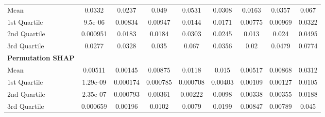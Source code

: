 {\begin{tabular} {lcccccccc}
\hspace{7pt}Mean & 0.0332 & 0.0237 & 0.049 & 0.0531 & 0.0308 & 0.0163 & 0.0357 & 0.067 \\ 
\hspace{7pt}1st Quartile & 9.5e-06 & 0.00834 & 0.00947 & 0.0144 & 0.0171 & 0.00775 & 0.00969 & 0.0322 \\ 
\hspace{7pt}2nd Quartile & 0.000951 & 0.0183 & 0.0184 & 0.0303 & 0.0245 & 0.013 & 0.024 & 0.0495 \\ 
\hspace{7pt}3rd Quartile & 0.0277 & 0.0328 & 0.035 & 0.067 & 0.0356 & 0.02 & 0.0479 & 0.0774 \\ 
\addlinespace[1ex] 
\textbf{Permutation SHAP} &  &  &  &  &  &  &  &  \\ 
\hspace{7pt}Mean & 0.00511 & \cellcolor{bronze!60}0.00145 & \cellcolor{bronze!60}0.00875 & 0.0118 & 0.015 & 0.00517 & 0.00868 & 0.0312 \\ 
\hspace{7pt}1st Quartile & 1.29e-09 & \cellcolor{bronze!60}0.000174 & \cellcolor{bronze!60}0.000785 & \cellcolor{bronze!60}0.000708 & \cellcolor{bronze!60}0.00403 & \cellcolor{silver!60}0.00109 & \cellcolor{silver!60}0.00127 & \cellcolor{bronze!60}0.0105 \\ 
\hspace{7pt}2nd Quartile & 2.35e-07 & \cellcolor{bronze!60}0.000793 & 0.00361 & \cellcolor{bronze!60}0.00222 & 0.0098 & \cellcolor{silver!60}0.00338 & \cellcolor{silver!60}0.00355 & 0.0188 \\ 
\hspace{7pt}3rd Quartile & 0.000659 & \cellcolor{bronze!60}0.00196 & 0.0102 & \cellcolor{bronze!60}0.0079 & 0.0199 & 0.00847 & \cellcolor{silver!60}0.00789 & 0.045 \\ 
\bottomrule
\end{tabular}}